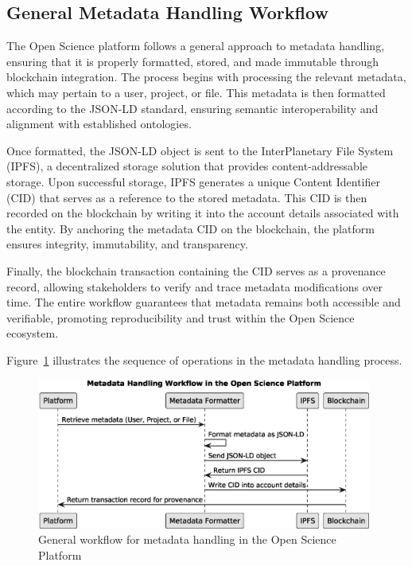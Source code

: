 \documentclass{article}
\begin{document}
\subsection{General Metadata Handling Workflow}

The Open Science platform follows a general approach to metadata handling, ensuring that it is properly formatted, stored, and made immutable through blockchain integration. The process begins with processing the relevant metadata, which may pertain to a user, project, or file. This metadata is then formatted according to the JSON-LD standard, ensuring semantic interoperability and alignment with established ontologies.

Once formatted, the JSON-LD object is sent to the InterPlanetary File System (IPFS), a decentralized storage solution that provides content-addressable storage. Upon successful storage, IPFS generates a unique Content Identifier (CID) that serves as a reference to the stored metadata. This CID is then recorded on the blockchain by writing it into the account details associated with the entity. By anchoring the metadata CID on the blockchain, the platform ensures integrity, immutability, and transparency.

Finally, the blockchain transaction containing the CID serves as a provenance record, allowing stakeholders to verify and trace metadata modifications over time. The entire workflow guarantees that metadata remains both accessible and verifiable, promoting reproducibility and trust within the Open Science ecosystem.

Figure~\ref{fig:metadata_workflow} illustrates the sequence of operations in the metadata handling process.


\begin{figure}[htbp]
      \centering
      \includegraphics[width=0.98\textwidth, keepaspectratio]{metadata_workflow_sequence.eps}
      \caption{General workflow for metadata handling in the Open Science Platform}
      \label{fig:metadata_workflow}
\end{figure}
\end{document}

